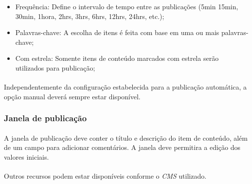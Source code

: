 \documentclass[a4paper,12pt]{article}
\def\cms{\emph{CMS}}
\begin{document}
\begin{itemize}


\item Frequência: Define o intervalo de tempo entre as publicações (5min 15min,
30min, 1hora, 2hrs, 3hrs, 6hrs, 12hrs, 24hrs, etc.);
\item Palavras-chave: A escolha de itens é feita com base em uma ou mais
palavras-chave;
\item Com estrela: Somente itens de conteúdo marcados com estrela serão
utilizados para publicação;
\end{itemize}

\paragraph{}
Independentemente da configuração estabelecida para a publicação automática, a
opção manual deverá sempre estar disponível.





\subsubsection{Janela de publicação}

\paragraph{}
A janela de publicação deve conter o título e descrição do item de conteúdo,
além de um campo para adicionar comentários. A janela deve permitira a edição
dos valores iniciais.

\paragraph{}
Outros recursos podem estar disponíveis conforme o \cms{} utilizado.
\end{document}
